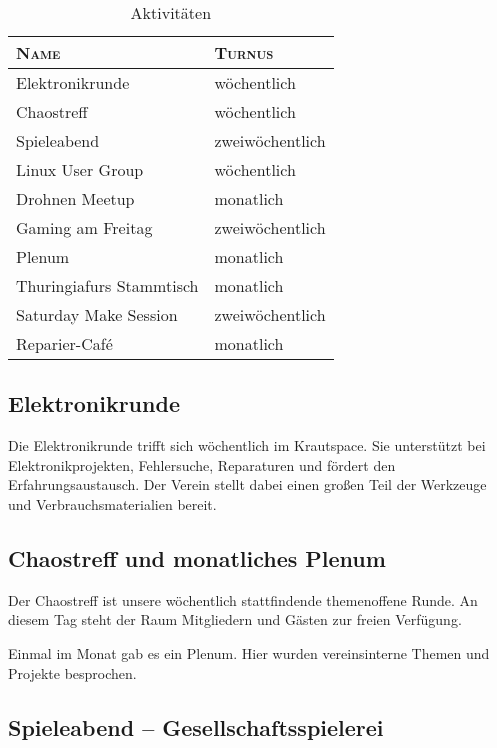\documentclass[ngerman]{scrartcl}
\begin{document}
\begin{table}[h]
  \centering{}
	\begin{tabularx}{\textwidth}{l|X}
          \toprule
		\textsc{Name} & \textsc{Turnus} \\ \midrule
		Elektronikrunde   & wöchentlich \\
		Chaostreff        & wöchentlich \\
		Spieleabend       & zweiwöchentlich \\
		Linux User Group  & wöchentlich \\
                Drohnen Meetup    & monatlich \\
		Gaming am Freitag & zweiwöchentlich \\
                Plenum            & monatlich \\
		Thuringiafurs Stammtisch & monatlich \\
		Saturday Make Session    & zweiwöchentlich \\
		Reparier-Café     & monatlich \\
\bottomrule
\end{tabularx}

\caption{Aktivitäten}
\end{table}

\subsection{Elektronikrunde}

Die Elektronikrunde trifft sich wöchentlich im Krautspace.
Sie unterstützt bei Elektronikprojekten, Fehlersuche,
Reparaturen und fördert den Erfahrungsaustausch.
Der Verein stellt dabei einen großen Teil der Werkzeuge und
Verbrauchsmaterialien bereit.

\subsection{Chaostreff und monatliches Plenum}

Der Chaostreff ist unsere wöchentlich stattfindende themenoffene Runde.
An diesem Tag steht der Raum Mitgliedern und Gästen zur freien Verfügung.

Einmal im Monat gab es ein Plenum. Hier wurden vereinsinterne Themen und Projekte besprochen.

\subsection{Spieleabend -- Gesellschaftsspielerei}
\end{document}
